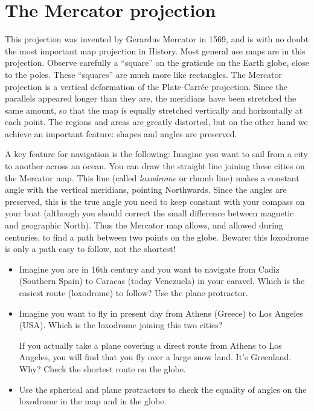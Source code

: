\documentclass[a4paper,12pt]{article}
\begin{document}
 
\newpage
\section{The Mercator projection}
This projection was invented by Gerardus Mercator in 1569, and is with no doubt the most important map projection in History. Most general
use maps are in this projection. Observe carefully a ``square'' on the graticule on the Earth globe, close to the poles. These ``squares''
are much more like rectangles. The Mercator projection is a vertical deformation of the Plate-Carrée projection. Since the parallels
appeared longer than they are, the meridians have been stretched the same amount, so that the map is equally stretched vertically and
horizontally at each point. The regions and areas are greatly distorted, but on the other hand we achieve an important feature: shapes and
angles are preserved.

A key feature for navigation is the following: Imagine you want to sail from a city to another across an ocean. You can draw the straight line joining these cities on the Mercator map. This line (called \emph{loxodrome} or rhumb line) makes a constant angle with the vertical meridians, pointing Northwards. Since the angles are preserved, this is the true angle you need to keep constant with your compass on your boat (although you should correct the small difference between magnetic and geographic North). Thus the Mercator map allows, and allowed during centuries, to find a path between two points on the globe. Beware: this loxodrome is only a path easy to follow, not the shortest!

\begin{itemize}
 \item Imagine you are in 16th century and you want to navigate from Cadiz (Southern Spain) to Caracas (today Venezuela) in your caravel.
Which is the easiest route (loxodrome) to follow? Use the plane protractor.

 \item Imagine you want to fly in present day from Athens (Greece) to Los Angeles (USA). Which is the loxodrome joining this two cities? 

If you actually take a plane covering a direct route from Athens to Los Angeles, you will find that you fly over a large snow land. It's
Greenland. Why? Check the shortest route on the globe.

 \item Use the spherical and plane protractors to check the equality of angles on the loxodrome in the map and in the globe.
\end{itemize}
\end{document}
